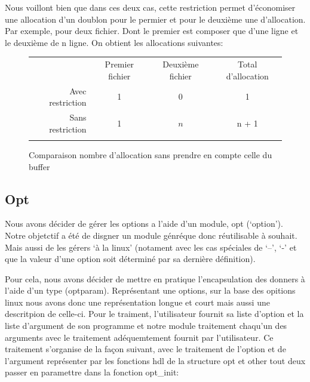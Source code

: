 \documentclass[12pt]{article}
\begin{document}
        Nous voillont bien que dans ces deux cas, cette restriction permet 
        d'économiser une allocation d'un doublon pour le permier et pour le 
        deuxième une d'allocation. Par exemple, pour deux fichier. Dont le 
        premier est composer que d'une ligne et le deuxième de n ligne. On 
        obtient les allocations suivantes:\\
        \begin{figure}[ht]
            \centering
            \begin{tabular}{ r c c c }
                \clay{}
                  \cellcolor{gray!25}     & Premier fichier & Deuxième fichier & 
                  Total d'allocation \\
                \clay{}
                Avec restriction  & 1 & 0 & 1 \\
                \clay{}
                Sans restriction & 1 & $n$ & n + 1\\
                \clay{}
            \end{tabular}
            \caption{Comparaison nombre d'allocation sans prendre en compte 
            celle du buffer}\label{tab-compar-da}
        \end{figure}

        
        \subsection{Opt}

        Nous avons décider de gérer les options a l'aide d'un module, opt 
        (`option'). Notre objetctif a été de disgner un module génréque donc 
        réutilisable à souhait. Mais aussi de les gérers `à la linux' (notament 
        avec les cas spéciales de `--', `-' et que la valeur d'une option soit 
        déterminé par sa dernière définition). 

        Pour cela, nous avons décider de mettre en pratique l'encapsulation des 
        donners à l'aide d'un type (optparam). Représentant une options, sur la 
        base des opitions linux nous avons donc une représentation longue et 
        court mais aussi une descritpion de celle-ci. Pour le traiment, 
        l'utilisateur fournit sa liste d'option et la liste d'argument de son 
        programme et notre module traitement chaqu'un des arguments avec le 
        traitement adéquemtement fournit par l'utilisateur. Ce traitement 
        s'organise de la façon suivant, avec le traitement de l'option et de 
        l'argument représenter par les fonctions hdl de la structure opt et 
        other tout deux passer en paramettre dans la fonction opt\_init:\\
\end{document}
